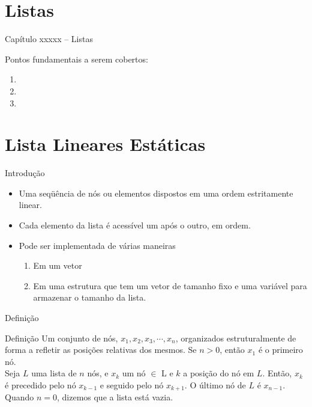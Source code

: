 
\section{Listas}

\begin{frame}
\begin{center}
{\Large Capítulo xxxxx -- Listas}

Pontos fundamentais a serem cobertos:

\begin{enumerate}
  \item 
  \item 
  \item 
\end{enumerate}

\end{center}

\end{frame}



\section{Lista Lineares Estáticas}
  \begin{frame}{Introdução}    
		\begin{itemize}
			\item Uma seqüência de nós ou elementos dispostos em uma ordem estritamente linear.
			\item Cada elemento da lista é acessível um após o outro, em ordem.
			\item Pode ser implementada de várias maneiras			
				\begin{enumerate}
					\item Em um vetor
					\item Em uma estrutura que tem um vetor de tamanho fixo e uma variável para armazenar o tamanho da lista.
				\end{enumerate}
		\end{itemize}
  \end{frame}
  
\begin{frame}{Definição}
     \begin{block}{Definição}
       Um conjunto de nós, $x_1, x_2, x_3, \cdots, x_n$, organizados estruturalmente de forma a refletir as posições relativas dos mesmos. Se $n > 0$, então $x_1$ é o primeiro nó. \\
       Seja $L$ uma lista de $n$ nós, e $x_k$ um nó $\in$ L e $k$ a posição do nó em $L$. Então, $x_k$ é precedido pelo nó $x_{k-1}$ e seguido pelo nó $x_{k+1}$. O último nó de $L$ é $x_{n-1}$. Quando $n = 0$, dizemos que a lista está vazia.
     \end{block}     
\end{frame}

